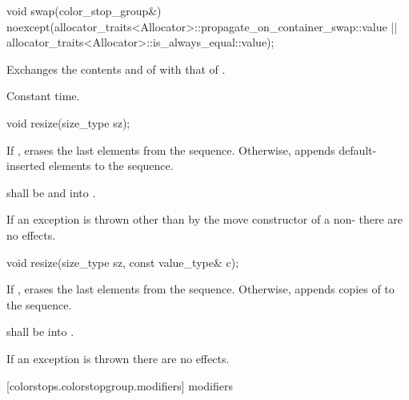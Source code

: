 \begin{itemdecl}
	void swap(color_stop_group&)
	noexcept(allocator_traits<Allocator>::propagate_on_container_swap::value ||
	allocator_traits<Allocator>::is_always_equal::value);
\end{itemdecl}
\begin{itemdescr}
	\pnum
	\effects
	Exchanges the contents and
	of
	with that of .
	
	\pnum
	\complexity
	Constant time.
\end{itemdescr}

\begin{itemdecl}
	void resize(size_type sz);
\end{itemdecl}
\begin{itemdescr}
	\pnum
	\effects
	If , erases the last  elements
	from the sequence. Otherwise, appends  default-inserted 
	elements to the sequence.
	
	\pnum
	\requires
	 shall be
	 and  into .
	
	\pnum
	\remarks
	If an exception is thrown other than by the move constructor of a 
	non-
	 there are no effects.
\end{itemdescr}

\begin{itemdecl}
	void resize(size_type sz, const value_type& c);
\end{itemdecl}
\begin{itemdescr}
	\pnum
	\effects
	If , erases the last  elements
	from the sequence. Otherwise,
	appends  copies of  to the sequence.
	
	\pnum
	\requires
	 shall be  into .
	
	\pnum
	\remarks
	If an exception is thrown there are no effects.
\end{itemdescr}

 [colorstops.colorstopgroup.modifiers] { modifiers}


